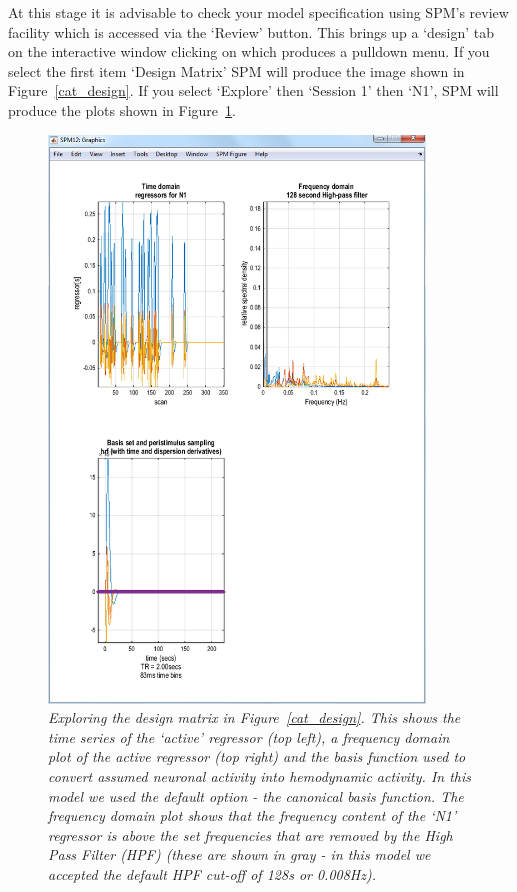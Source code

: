 \documentclass[a4paper,titlepage]{book}
\begin{document}
At this stage it is advisable to check your model specification
using SPM's review facility which is accessed via
the `Review' button. This brings up a `design' tab on the 
interactive window clicking on which produces a pulldown
menu. If you select the first item `Design Matrix' SPM will 
produce the image shown in Figure~\ref{cat_design}. 
If you select `Explore' then `Session 1' then `N1', SPM will produce 
the plots shown in Figure~\ref{cat_explore}.
\begin{figure}
\begin{center}
\includegraphics[width=100mm]{cat_explore}
\caption{\em Exploring the design matrix in Figure~\ref{cat_design}. This shows the time series of 
the `active' regressor (top left), a frequency domain plot of the active regressor (top right) and 
the basis function used to convert assumed neuronal activity into hemodynamic activity. In this model 
we used the default option - the canonical basis function. The frequency domain plot shows that the 
frequency content of the `N1' regressor is above the set frequencies that are removed by the High Pass 
Filter (HPF) (these are shown in gray - in this model we accepted the default HPF cut-off of 128s or 
0.008Hz). \label{cat_explore}}
\end{center}
\end{figure}
\end{document}
